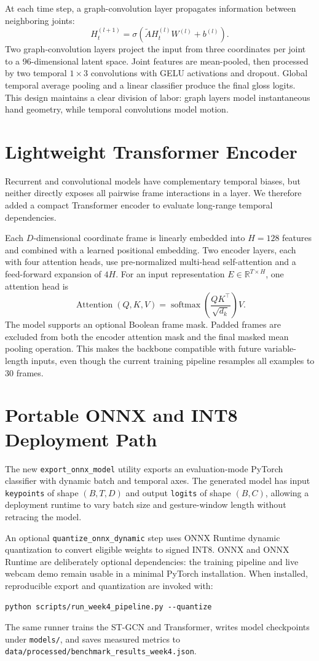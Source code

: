 \documentclass{article}
\begin{document}
At each time step, a graph-convolution layer propagates information between neighboring joints:
\[
H_t^{(l+1)} = \sigma\left(\widetilde{A}H_t^{(l)}W^{(l)} + b^{(l)}\right).
\]
Two graph-convolution layers project the input from three coordinates per joint to a 96-dimensional latent space. Joint features are mean-pooled, then processed by two temporal $1\times3$ convolutions with GELU activations and dropout. Global temporal average pooling and a linear classifier produce the final gloss logits. This design maintains a clear division of labor: graph layers model instantaneous hand geometry, while temporal convolutions model motion.

\section*{Lightweight Transformer Encoder}
Recurrent and convolutional models have complementary temporal biases, but neither directly exposes all pairwise frame interactions in a layer. We therefore added a compact Transformer encoder \cite{vaswani2017attention} to evaluate long-range temporal dependencies.

Each $D$-dimensional coordinate frame is linearly embedded into $H=128$ features and combined with a learned positional embedding. Two encoder layers, each with four attention heads, use pre-normalized multi-head self-attention and a feed-forward expansion of $4H$. For an input representation $E\in\mathbb{R}^{T\times H}$, one attention head is
\[
\operatorname{Attention}(Q,K,V)=\operatorname{softmax}\left(\frac{QK^\top}{\sqrt{d_k}}\right)V.
\]
The model supports an optional Boolean frame mask. Padded frames are excluded from both the encoder attention mask and the final masked mean pooling operation. This makes the backbone compatible with future variable-length inputs, even though the current training pipeline resamples all examples to 30 frames.

\section*{Portable ONNX and INT8 Deployment Path}
The new \texttt{export\_onnx\_model} utility exports an evaluation-mode PyTorch classifier with dynamic batch and temporal axes. The generated model has input \texttt{keypoints} of shape $(B,T,D)$ and output \texttt{logits} of shape $(B,C)$, allowing a deployment runtime to vary batch size and gesture-window length without retracing the model.

An optional \texttt{quantize\_onnx\_dynamic} step uses ONNX Runtime dynamic quantization to convert eligible weights to signed INT8. ONNX and ONNX Runtime are deliberately optional dependencies: the training pipeline and live webcam demo remain usable in a minimal PyTorch installation. When installed, reproducible export and quantization are invoked with:
\begin{verbatim}
python scripts/run_week4_pipeline.py --quantize
\end{verbatim}
The same runner trains the ST-GCN and Transformer, writes model checkpoints under \texttt{models/}, and saves measured metrics to \texttt{data/processed/benchmark\_results\_week4.json}.
\end{document}
